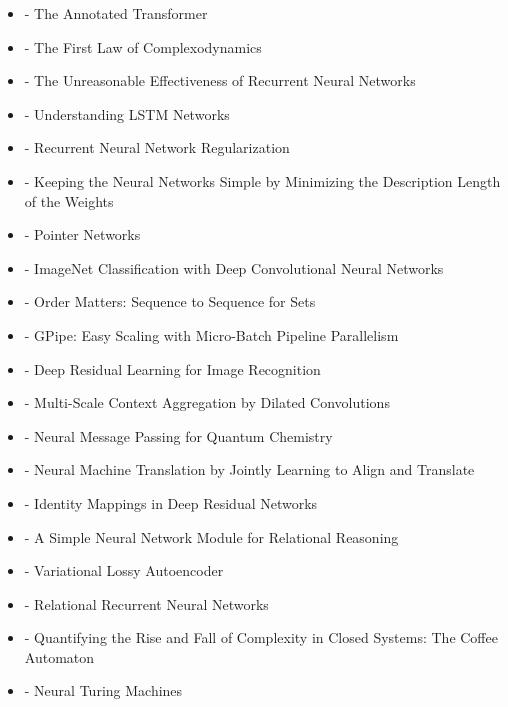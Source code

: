 \documentclass[
  letterpaper,
  DIV=11,
  numbers=noendperiod]{scrartcl}
\providecommand{\tightlist}{%
  \setlength{\itemsep}{0pt}\setlength{\parskip}{0pt}}
\begin{document}
\begin{itemize}
\tightlist
\item
  \autocite{rush2018annotated} - The Annotated Transformer
\item
  \autocite{aaronson2011first} - The First Law of Complexodynamics
\item
  \autocite{karpathy2015unreasonable} - The Unreasonable Effectiveness
  of Recurrent Neural Networks
\item
  \autocite{olah2015understanding} - Understanding LSTM Networks
\item
  \autocite{zaremba2014recurrent} - Recurrent Neural Network
  Regularization
\item
  \autocite{hinton1993keeping} - Keeping the Neural Networks Simple by
  Minimizing the Description Length of the Weights
\item
  \autocite{vinyals2015pointer} - Pointer Networks
\item
  \autocite{krizhevsky2012imagenet} - ImageNet Classification with Deep
  Convolutional Neural Networks
\item
  \autocite{vinyals2016order} - Order Matters: Sequence to Sequence for
  Sets
\item
  \autocite{huang2019gpipe} - GPipe: Easy Scaling with Micro-Batch
  Pipeline Parallelism
\item
  \autocite{he2016deep} - Deep Residual Learning for Image Recognition
\item
  \autocite{yu2016multi} - Multi-Scale Context Aggregation by Dilated
  Convolutions
\item
  \autocite{gilmer2017neural} - Neural Message Passing for Quantum
  Chemistry
\item
  \autocite{bahdanau2016neural} - Neural Machine Translation by Jointly
  Learning to Align and Translate
\item
  \autocite{he2016identity} - Identity Mappings in Deep Residual
  Networks
\item
  \autocite{santoro2017simple} - A Simple Neural Network Module for
  Relational Reasoning
\item
  \autocite{chen2017variational} - Variational Lossy Autoencoder
\item
  \autocite{santoro2018relational} - Relational Recurrent Neural
  Networks
\item
  \autocite{aaronson2014quantifying} - Quantifying the Rise and Fall of
  Complexity in Closed Systems: The Coffee Automaton
\item
  \autocite{graves2014neural} - Neural Turing Machines

\end{itemize}
\end{document}
